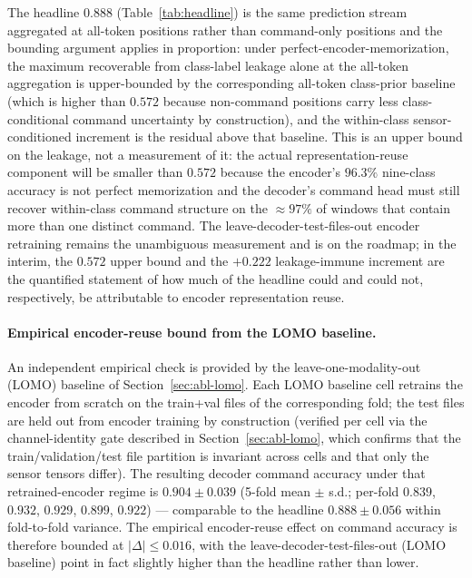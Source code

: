 \documentclass[11pt,a4paper]{article}
\begin{document}
The headline $0.888$ (Table~\ref{tab:headline}) is the same prediction stream aggregated at all-token positions rather than command-only positions and the bounding argument applies in proportion: under perfect-encoder-memorization, the maximum recoverable from class-label leakage alone at the all-token aggregation is upper-bounded by the corresponding all-token class-prior baseline (which is higher than $0.572$ because non-command positions carry less class-conditional command uncertainty by construction), and the within-class sensor-conditioned increment is the residual above that baseline. This is an upper bound on the leakage, not a measurement of it: the actual representation-reuse component will be smaller than $0.572$ because the encoder's $96.3\%$ nine-class accuracy is not perfect memorization and the decoder's command head must still recover within-class command structure on the $\approx\!97\%$ of windows that contain more than one distinct command. The leave-decoder-test-files-out encoder retraining remains the unambiguous measurement and is on the roadmap; in the interim, the $0.572$ upper bound and the $+0.222$ leakage-immune increment are the quantified statement of how much of the headline could and could not, respectively, be attributable to encoder representation reuse.

\paragraph{Empirical encoder-reuse bound from the LOMO baseline.} An independent empirical check is provided by the leave-one-modality-out (LOMO) baseline of Section~\ref{sec:abl-lomo}. Each LOMO baseline cell retrains the encoder from scratch on the train+val files of the corresponding fold; the test files are held out from encoder training by construction (verified per cell via the channel-identity gate described in Section~\ref{sec:abl-lomo}, which confirms that the train/validation/test file partition is invariant across cells and that only the sensor tensors differ). The resulting decoder command accuracy under that retrained-encoder regime is $0.904 \pm 0.039$ (5-fold mean $\pm$ s.d.; per-fold $0.839$, $0.932$, $0.929$, $0.899$, $0.922$) --- comparable to the headline $0.888 \pm 0.056$ within fold-to-fold variance. The empirical encoder-reuse effect on command accuracy is therefore bounded at $|\Delta|\!\le\!0.016$, with the leave-decoder-test-files-out (LOMO baseline) point in fact slightly higher than the headline rather than lower.
\end{document}

